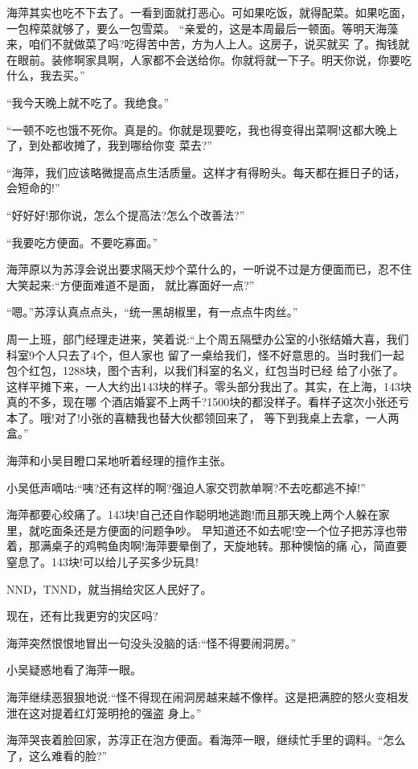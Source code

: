\documentclass[11pt,a4paper,onecolumn]{article}
\begin{document}
海萍其实也吃不下去了。一看到面就打恶心。可如果吃饭，就得配菜。如果吃面，一包榨菜就够了，要么一包雪菜。
``亲爱的，这是本周最后一顿面。等明天海藻来，咱们不就做菜了吗?吃得苦中苦，方为人上人。这房子，说买就买
了。掏钱就在眼前。装修啊家具啊，人家都不会送给你。你就将就一下子。明天你说，你要吃什么，我去买。''

``我今天晚上就不吃了。我绝食。''

``一顿不吃也饿不死你。真是的。你就是现要吃，我也得变得出菜啊!这都大晚上了，到处都收摊了，我到哪给你变
菜去?''

``海萍，我们应该略微提高点生活质量。这样才有得盼头。每天都在捱日子的话，会短命的!''

``好好好!那你说，怎么个提高法?怎么个改善法?''

``我要吃方便面。不要吃寡面。''

海萍原以为苏淳会说出要求隔天炒个菜什么的，一听说不过是方便面而已，忍不住大笑起来:``方便面难道不是面，
就比寡面好一点?''

``嗯。''苏淳认真点点头，``统一黑胡椒里，有一点点牛肉丝。''

周一上班，部门经理走进来，笑着说:``上个周五隔壁办公室的小张结婚大喜，我们科室9个人只去了4个，但人家也
留了一桌给我们，怪不好意思的。当时我们一起包个红包，1288块，图个吉利，以我们科室的名义，红包当时已经
给了小张了。这样平摊下来，一人大约出143块的样子。零头部分我出了。其实，在上海，143块真的不多，现在哪
个酒店婚宴不上两千?1500块的都没样子。看样子这次小张还亏本了。哦!对了!小张的喜糖我也替大伙都领回来了，
等下到我桌上去拿，一人两盒。''

海萍和小吴目瞪口呆地听着经理的擅作主张。

小吴低声嘀咕:``咦?还有这样的啊?强迫人家交罚款单啊?不去吃都逃不掉!''

海萍都要心绞痛了。143块!自己还自作聪明地逃跑!而且那天晚上两个人躲在家里，就吃面条还是方便面的问题争吵。
早知道还不如去呢!空一个位子把苏淳也带着，那满桌子的鸡鸭鱼肉啊!海萍要晕倒了，天旋地转。那种懊恼的痛
心，简直要窒息了。143块!可以给儿子买多少玩具!

NND，TNND，就当捐给灾区人民好了。

现在，还有比我更穷的灾区吗?

海萍突然恨恨地冒出一句没头没脑的话:``怪不得要闹洞房。''

小吴疑惑地看了海萍一眼。

海萍继续恶狠狠地说:``怪不得现在闹洞房越来越不像样。这是把满腔的怒火变相发泄在这对提着红灯笼明抢的强盗
身上。''

海萍哭丧着脸回家，苏淳正在泡方便面。看海萍一眼，继续忙手里的调料。``怎么了，这么难看的脸?''
\end{document}
